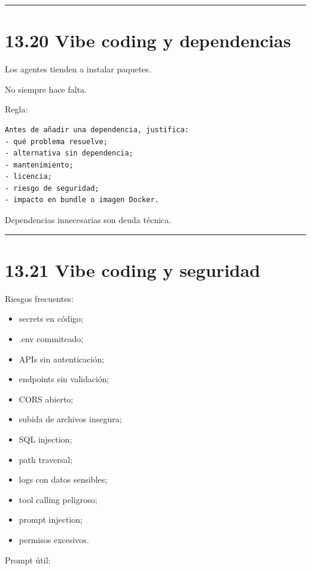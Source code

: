 \begin{center}\rule{0.5\linewidth}{0.5pt}\end{center}

\section{13.20 Vibe coding y
dependencias}\label{vibe-coding-y-dependencias}

Los agentes tienden a instalar paquetes.

No siempre hace falta.

Regla:

\begin{lstlisting}
Antes de añadir una dependencia, justifica:
- qué problema resuelve;
- alternativa sin dependencia;
- mantenimiento;
- licencia;
- riesgo de seguridad;
- impacto en bundle o imagen Docker.
\end{lstlisting}

Dependencias innecesarias son deuda técnica.

\begin{center}\rule{0.5\linewidth}{0.5pt}\end{center}

\section{13.21 Vibe coding y seguridad}\label{vibe-coding-y-seguridad}

Riesgos frecuentes:

\begin{itemize}
\tightlist
\item
  secrets en código;
\item
  .env commiteado;
\item
  APIs sin autenticación;
\item
  endpoints sin validación;
\item
  CORS abierto;
\item
  subida de archivos insegura;
\item
  SQL injection;
\item
  path traversal;
\item
  logs con datos sensibles;
\item
  tool calling peligroso;
\item
  prompt injection;
\item
  permisos excesivos.
\end{itemize}

Prompt útil:

